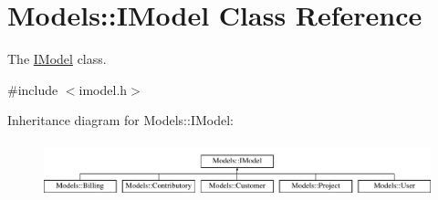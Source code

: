 \hypertarget{classModels_1_1IModel}{}\section{Models\+:\+:I\+Model Class Reference}
\label{classModels_1_1IModel}


The \hyperlink{classModels_1_1IModel}{I\+Model} class.  




{\ttfamily \#include $<$imodel.\+h$>$}

Inheritance diagram for Models\+:\+:I\+Model\+:\begin{figure}[H]
\begin{center}
\leavevmode
\includegraphics[height=1.635036cm]{d0/d9c/classModels_1_1IModel}
\end{center}
\end{figure}
